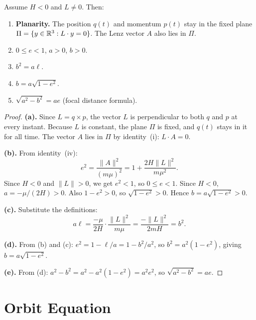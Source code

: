 \begin{proposition}\label{thm:ellipse-parameters}
Assume $H < 0$ and $L \neq 0$. Then:
\begin{enumerate}
  \item[\textup{(a)}] \textbf{Planarity.}
    The position $q(t)$ and momentum $p(t)$ stay in the fixed plane $\Pi = \{y \in \mathbb{R}^3 : L \cdot y = 0\}$.
    The Lenz vector $A$ also lies in $\Pi$.
  \item[\textup{(b)}] $0 \le e < 1$, \quad $a > 0$, \quad $b > 0$.
  \item[\textup{(c)}] $b^2 = a\ell$.
  \item[\textup{(d)}] $b = a\sqrt{1-e^2}$.
  \item[\textup{(e)}] $\sqrt{a^2 - b^2} = ae$ \quad (focal distance formula).
\end{enumerate}
\leanok
\begin{proof}
\textbf{(a).}
Since $L = q \times p$, the vector $L$ is perpendicular to both $q$ and $p$ at every instant.
Because $L$ is constant, the plane $\Pi$ is fixed, and $q(t)$ stays in it for all time.
The vector $A$ lies in $\Pi$ by identity~(i): $L \cdot A = 0$.

\textbf{(b).}
From identity~(iv):
\[
  e^2 = \frac{\|A\|^2}{(m\mu)^2} = 1 + \frac{2H\|L\|^2}{m\mu^2}.
\]
Since $H < 0$ and $\|L\| > 0$, we get $e^2 < 1$, so $0 \le e < 1$.
Since $H < 0$, $a = -\mu/(2H) > 0$.
Also $1-e^2 > 0$, so $\sqrt{1-e^2} > 0$.
Hence $b = a\sqrt{1-e^2} > 0$.

\textbf{(c).}
Substitute the definitions:
\[
  a\ell = \frac{-\mu}{2H} \cdot \frac{\|L\|^2}{m\mu} = \frac{-\|L\|^2}{2mH} = b^2.
\]

\textbf{(d).}
From (b) and (c): $e^2 = 1 - \ell/a = 1 - b^2/a^2$, so $b^2 = a^2(1-e^2)$, giving $b = a\sqrt{1-e^2}$.

\textbf{(e).}
From (d): $a^2 - b^2 = a^2 - a^2(1-e^2) = a^2 e^2$, so $\sqrt{a^2-b^2} = ae$.
\end{proof}
\end{proposition}

\section{Orbit Equation}

